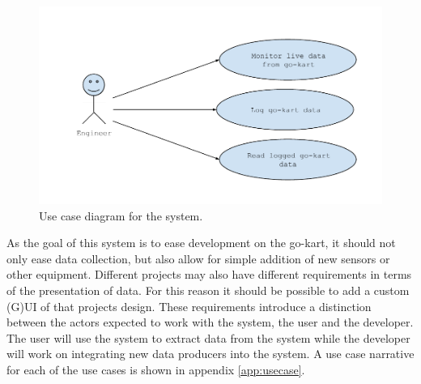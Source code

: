 \begin{figure}[h]
 	\centering
    \includegraphics[width=1\textwidth]{graphics/use_cases}
    \caption{Use case diagram for the system.}
    \label{fig:usecases}
\end{figure}

As the goal of this system is to ease development on the go-kart, it should not only ease data collection, but also allow for simple addition of new sensors or other equipment.
Different projects may also have different requirements in terms of the presentation of data.
For this reason it should be possible to add a custom (G)UI of that projects design.
These requirements introduce a distinction between the actors expected to work with the system, the user and the developer.
The user will use the system to extract data from the system while the developer will work on integrating new data producers into the system.
A use case narrative for each of the use cases is shown in appendix \ref{app:usecase}.